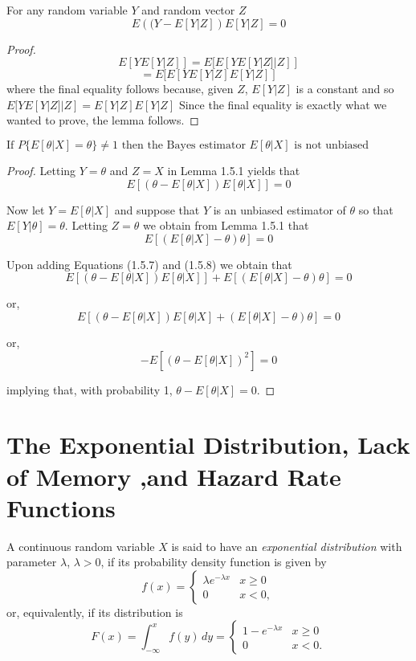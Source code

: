 \documentclass[lang=cn,10pt]{elegantbook}
\begin{document}
\begin{lemma}
	For any random variable $Y$ and random vector $Z$
\[
E\left((Y - E[Y | Z]\right) E[Y | Z] = 0
\]
\end{lemma}
\begin{proof}
	\[
E[Y E[Y | Z]] = E[E[Y E[Y | Z] | Z]]
\]
\[
= E[E[Y E[Y | Z] E[Y | Z]]
\]
where the final equality follows because, given $Z$, $E[Y | Z]$ is a constant and so $E[Y E[Y | Z] | Z] = E[Y | Z] E[Y | Z]$ Since the final equality is exactly what we wanted to prove, the lemma follows.
\end{proof}
\begin{proposition}
	$\text{If } P\{E[\theta | X] = \theta\} \neq 1 \text{ then the Bayes estimator } E[\theta | X] \text{ is not unbiased}$
\end{proposition}
\begin{proof}
	Letting $Y = \theta$ and $Z = X$ in Lemma 1.5.1 yields that
\begin{equation}
E[(\theta - E[\theta | X]) E[\theta | X]] = 0 \tag{1.5.7}
\end{equation}

Now let $Y = E[\theta | X]$ and suppose that $Y$ is an unbiased estimator of $\theta$ so that $E[Y | \theta] = \theta$. Letting $Z = \theta$ we obtain from Lemma 1.5.1 that
\begin{equation}
E[(E[\theta | X] - \theta) \theta] = 0 \tag{1.5.8}
\end{equation}

Upon adding Equations (1.5.7) and (1.5.8) we obtain that
\begin{equation}
E[(\theta - E[\theta | X]) E[\theta | X]] + E[(E[\theta | X] - \theta) \theta] = 0
\end{equation}

or,
\begin{equation}
E[(\theta - E[\theta | X]) E[\theta | X] + (E[\theta | X] - \theta) \theta] = 0
\end{equation}

or,
\begin{equation}
-E[(\theta - E[\theta | X])^2] = 0
\end{equation}

implying that, with probability 1, $\theta - E[\theta | X] = 0$.
\end{proof}
\section{The Exponential Distribution, Lack of Memory ,and Hazard Rate Functions }
A continuous random variable $X$ is said to have an \textit{exponential distribution} with parameter $\lambda$, $\lambda > 0$, if its probability density function is given by
\[
f(x) = 
\begin{cases} 
\lambda e^{-\lambda x} & x \geq 0 \\
0 & x < 0,
\end{cases}
\]
or, equivalently, if its distribution is
\[
F(x) = \int_{-\infty}^{x} f(y) \, dy = 
\begin{cases} 
1 - e^{-\lambda x} & x \geq 0 \\
0 & x < 0.
\end{cases}
\]
\end{document}
